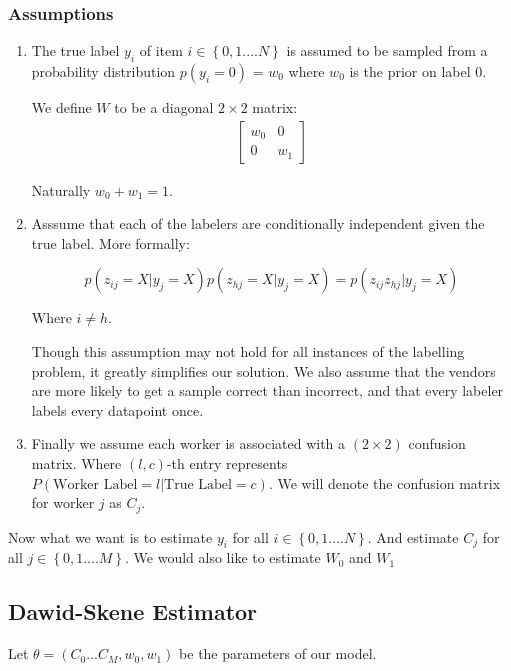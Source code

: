 \subsubsection{Assumptions}
\begin{enumerate}
\item
The true label $y_{i}$ of item
$i \in \left\{0,1....N\right\}$ is assumed to be sampled from a probability
distribution $p(y_{i} = 0)$ = $w_{0}$ where $w_{0}$ is the prior on label 0.

We define $W$ to be a diagonal $2 \times 2$ matrix:
\begin{align}
\begin{bmatrix}
w_{0} & 0 \\
0     & w_{1}
\end{bmatrix}
\end{align}

Naturally $w_{0} + w_{1} = 1$. \\

\item
Asssume that each of the labelers are conditionally independent given the true label. More formally:

$$p(z_{ij} = X | y_{j} = X)p(z_{hj} = X | y_{j} = X) = p(z_{ij}z_{hj} | y_{j} = X)$$

Where $i \neq h$.

Though this assumption may not hold for all instances of the labelling problem, it greatly simplifies our solution. We also assume that the vendors are more likely to get a sample correct than incorrect, and that every labeler labels every datapoint once.

\item
    Finally we assume each worker is associated with a $(2 \times 2)$ confusion matrix. Where $(l,c)$-th entry represents $P(\text{Worker Label} = l| \text{True Label} = c)$. We will denote the confusion matrix for worker $j$ as  $C_{j}$.

\end{enumerate}

Now what we want is to estimate $y_{i}$ for all $i \in \left\{0,1....N\right\}$. And estimate $C_{j}$ for all $j \in \left\{0,1....M\right\}$.
We would also like to estimate $W_{0}$ and $W_{1}$

\subsection{Dawid-Skene Estimator}
Let $\theta = (C_{0}...C_{M},w_{0},w_{1})$ be the parameters of our model.


